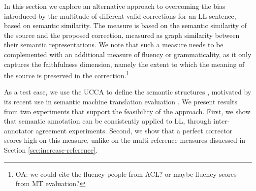 \documentclass[letter,11pt]{article}
\newcommand{\oa}[1]{\footnote{\color{red}OA: #1}}
\begin{document}
{In this section we explore an alternative approach to overcoming the bias
introduced by the multitude of different valid corrections for an LL sentence, based
on semantic similarity.
The measure is based on the semantic similarity of the source and the proposed correction,
measured as graph similarity between their semantic representations.
We note that such a measure needs to be complemented with an additional
measure of fluency or grammaticality, as it only captures
the faithfulness dimension, namely the extent to which
the meaning of the source is preserved in the 
correction.\oa{we could cite the fluency people from ACL? or maybe fluency scores from MT evaluation?}

As a test case, we use the UCCA to define the semantic structures \cite{abend2013universal}, motivated by
its recent use in semantic machine translation evaluation \cite{birch2016hume}.
We present results from two experiments that support the feasibility of the approach.
First, we show that semantic annotation can be consistently applied to LL,
through inter-annotator agreement experiments.
Second, we show that a perfect corrector scores high on this measure, unlike on
the multi-reference measures disucssed in Section \ref{sec:increase-reference}.




}
\end{document}
